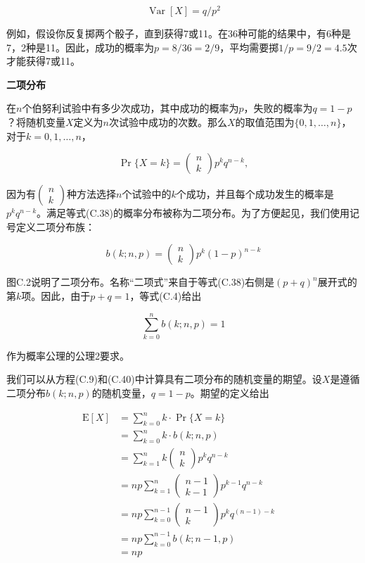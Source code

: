 \documentclass[lang=cn,newtx,10pt,scheme=chinese]{elegantbook}
\begin{document}
$$
\operatorname{Var}[X]=q/p^2
$$

例如，假设你反复掷两个骰子，直到获得7或11。在36种可能的结果中，有6种是7，2种是11。因此，成功的概率为$p=8/36=2/9$，平均需要掷$1/p=9/2=4.5$次才能获得7或11。

\textbf{二项分布}

在$n$个伯努利试验中有多少次成功，其中成功的概率为$p$，失败的概率为$q=1-p$？将随机变量$X$定义为$n$次试验中成功的次数。那么$X$的取值范围为$\{0,1, \ldots, n\}$，对于$k=0,1, \ldots, n$，

$$
\operatorname{Pr}\{X=k\}=(\begin{array}{l}
n \\
k
\end{array}) p^k q^{n-k},
$$

因为有$(\begin{array}{l}n \\ k\end{array})$种方法选择$n$个试验中的$k$个成功，并且每个成功发生的概率是$p^k q^{n-k}$。满足等式(C.38)的概率分布被称为二项分布。为了方便起见，我们使用记号定义二项分布族：

$$
b(k ; n, p)=(\begin{array}{l}
n \\
k
\end{array}) p^k(1-p)^{n-k}
$$

图C.2说明了二项分布。名称``二项式''来自于等式(C.38)右侧是$(p+q)^n$展开式的第$k$项。因此，由于$p+q=1$，等式(C.4)给出

$$
\sum_{k=0}^n b(k ; n, p)=1
$$

作为概率公理的公理2要求。

我们可以从方程(C.9)和(C.40)中计算具有二项分布的随机变量的期望。设$X$是遵循二项分布$b(k; n, p)$的随机变量，$q=1-p$。期望的定义给出

$$
\begin{aligned}
\mathrm{E}[X] & =\sum_{k=0}^n k \cdot \operatorname{Pr}\{X=k\} \\
& =\sum_{k=0}^n k \cdot b(k ; n, p) \\
& =\sum_{k=1}^n k(\begin{array}{l}
n \\
k
\end{array}) p^k q^{n-k} \\
& =n p \sum_{k=1}^n(\begin{array}{c}
n-1 \\
k-1
\end{array}) p^{k-1} q^{n-k} \\
& =n p \sum_{k=0}^{n-1}(\begin{array}{c}
n-1 \\
k
\end{array}) p^k q^{(n-1)-k} \quad \\
& =n p \sum_{k=0}^{n-1} b(k ; n-1, p) \\
& =n p
\end{aligned}
$$
\end{document}
